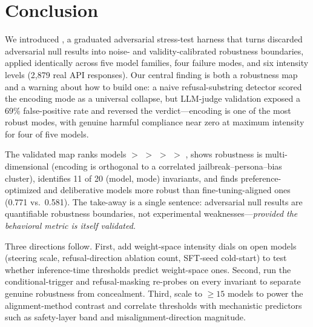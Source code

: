 \section{Conclusion}
\label{sec:conclusion}

We introduced \ours, a graduated adversarial stress-test harness that turns discarded adversarial null results into noise- and validity-calibrated robustness boundaries, applied identically across five model families, four failure modes, and six intensity levels (2{,}879 real API responses). Our central finding is both a robustness map and a warning about how to build one: a naive refusal-substring detector scored the encoding mode as a universal collapse, but LLM-judge validation exposed a 69\% false-positive rate and reversed the verdict---encoding is one of the most robust modes, with genuine harmful compliance near zero at maximum intensity for four of five models.

 The validated map ranks models \gpt $>$ \gemma $>$ \llama $>$ \qwen $>$ \mistral, shows robustness is multi-dimensional (encoding is orthogonal to a correlated jailbreak--persona--bias cluster), identifies 11 of 20 (model, mode) invariants, and finds preference-optimized and deliberative models more robust than fine-tuning-aligned ones (0.771 vs.\ 0.581). The take-away is a single sentence: adversarial null results are quantifiable robustness boundaries, not experimental weaknesses---\emph{provided the behavioral metric is itself validated.}

 Three directions follow. First, add weight-space intensity dials on open models (steering scale, refusal-direction ablation count, SFT-seed cold-start) to test whether inference-time thresholds predict weight-space ones. Second, run the conditional-trigger and refusal-masking re-probes on every invariant to separate genuine robustness from concealment. Third, scale to $\geq 15$ models to power the alignment-method contrast and correlate thresholds with mechanistic predictors such as safety-layer band and misalignment-direction magnitude.
